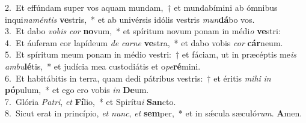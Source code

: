 {2.~}Et effúndam super vos aquam mundam,~† et mundabímini ab ómnibus inqui\textit{na}\textit{mén}\textit{tis} \textbf{ve}stris,~* et ab univérsis idólis vestris \textit{mun}\textbf{dá}bo vos.\\
{3.~}Et dabo \textit{vo}\textit{bis} \textit{cor} \textbf{no}vum,~* et spíritum novum ponam in médi\textit{o} \textbf{ve}stri:\\
{4.~}Et áuferam cor lapídeum \textit{de} \textit{car}\textit{ne} \textbf{ve}stra,~* et dabo vobis \textit{cor} \textbf{cár}neum.\\
{5.~}Et spíritum meum ponam in médio vestri:~† et fáciam, ut in præcéptis me\textit{is} \textit{am}\textit{bu}\textbf{lé}tis,~* et judícia mea custodiátis et o\textit{pe}\textbf{ré}mini.\\
{6.~}Et habitábitis in terra, quam dedi pátribus vestris:~† et éritis \textit{mi}\textit{hi} \textit{in} \textbf{pó}pulum,~* et ego ero vobis \textit{in} \textbf{De}um.\\
{7.~}Glória \textit{Pa}\textit{tri}, \textit{et} \textbf{Fí}lio,~* et Spirítu\textit{i} \textbf{San}cto.\\
{8.~}Sicut erat in princípio, \textit{et} \textit{nunc}, \textit{et} \textbf{sem}per,~* et in sǽcula sæculó\textit{rum}. \textbf{A}men.\\
